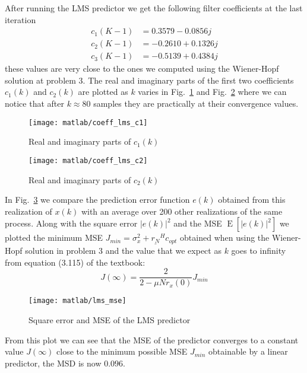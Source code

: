 \documentclass{article}
\renewcommand{\vec}[1]{\underline{#1}}
\newcommand{\E}[1]{\operatorname{E}\left[#1\right]}
\newcommand{\abs}[1]{\left|#1\right|}
\begin{document}
After running the LMS predictor we get the following filter
coefficients at the last iteration
\begin{align*}
  c_1(K-1) &= 0.3579 - 0.0856j   \\
  c_2(K-1) &=  -0.2610 + 0.1326j \\
  c_3(K-1) &= -0.5139 + 0.4384j
\end{align*}
these values are very close to the ones we computed using the
Wiener-Hopf solution at problem 3. The real and imaginary parts of the
first two coefficients $c_1(k)$ and $c_2(k)$ are plotted as $k$ varies
in Fig.~\ref{plot:coeff_lms_c1} and Fig.~\ref{plot:coeff_lms_c2} where
we can notice that after $k \approx 80$ samples they are practically
at their convergence values.
\begin{figure}[htbp]
  \centering
  \texttt{[image: matlab/coeff\_lms\_c1]}
  \caption{Real and imaginary parts of $c_1(k)$}
  \label{plot:coeff_lms_c1}
\end{figure}
\begin{figure}[htbp]
  \centering
  \texttt{[image: matlab/coeff\_lms\_c2]}
  \caption{Real and imaginary parts of $c_2(k)$}
  \label{plot:coeff_lms_c2}
\end{figure}

In Fig.~\ref{plot:lms_mse} we compare the prediction error function
$e(k)$ obtained from this realization of $x(k)$ with an average over
200 other realizations of the same process.  Along with the square
error $\abs{e(k)}^2$ and the MSE $\E{ \abs{e(k)}^2 }$ we plotted the
minimum MSE $J_{min} = \sigma^2_x + \vec{r_N}^Hc_{opt}$ obtained when
using the Wiener-Hopf solution in problem 3 and the value that we
expect as $k$ goes to infinity from equation (3.115) of the textbook:
\[ J(\infty) = \frac{2}{2-\mu N r_x(0)}J_{min} \]
\begin{figure}[htbp]
  \centering
  \texttt{[image: matlab/lms\_mse]}
  \caption{Square error and MSE of the LMS predictor}
  \label{plot:lms_mse}
\end{figure}
From this plot we can see that the MSE of the predictor converges to a
constant value $J(\infty)$ close to the minimum possible MSE $J_{min}$
obtainable by a linear predictor, the MSD is now $0.096$.
\end{document}
